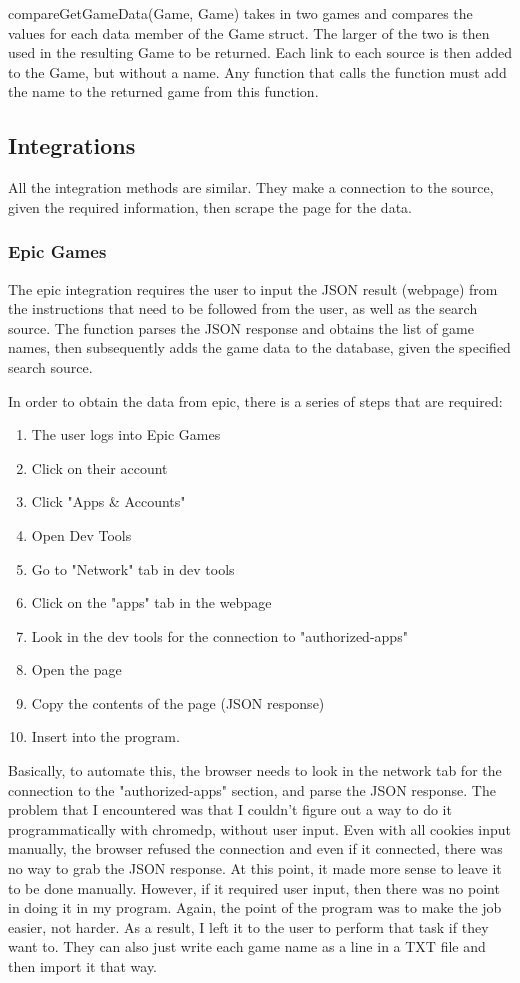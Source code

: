 compareGetGameData(Game, Game) takes in two games and compares the
values for each data member of the Game struct. The larger of the two
is then used in the resulting Game to be returned.
Each link to each source is then added to the Game, but without a name.
Any function that calls the function must add the name to the
returned game from this function.

\subsection{Integrations}
\label{subsec:Integrations}

All the integration methods are similar. They make a connection to
the source, given the required information, then scrape the page for the data.

\subsubsection{Epic Games}
\label{subsubsec:EpicInt}

The epic integration requires the user to input the JSON result
(webpage) from the
instructions that need to be followed from the user, as well as the
search source.
The function parses the JSON response and obtains the list of game
names, then subsequently adds the game data to the database, given
the specified search source.

In order to obtain the data from epic, there is a series of steps
that are required:
\begin{enumerate}
	\item The user logs into Epic Games
	\item Click on their account
	\item Click "Apps \& Accounts"
	\item Open Dev Tools
	\item Go to "Network" tab in dev tools
	\item Click on the "apps" tab in the webpage
	\item Look in the dev tools for the connection to "authorized-apps"
	\item Open the page
	\item Copy the contents of the page (JSON response)
	\item Insert into the program.
\end{enumerate}

Basically, to automate this, the browser needs to look in the network
tab for the connection to the "authorized-apps" section, and parse
the JSON response.
The problem that I encountered was that I couldn't figure out a way
to do it programmatically with chromedp, without user input. Even
with all cookies input manually, the browser refused the connection
and even if it connected, there was no way to grab the JSON response.
At this point, it made more sense to leave it to be done manually.
However, if it
required user input, then there was no point in doing it in my
program. Again, the point of the program was to make the job easier, not harder.
As a result, I left it to the user to perform that task if they want
to. They can also just write each game name as a line in a TXT file
and then import it that way.

